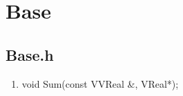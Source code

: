 \chapter{Base}
\section{Base.h}
\begin{enumerate}
\item void Sum(const VVReal \&, VReal*);
\end{enumerate}
